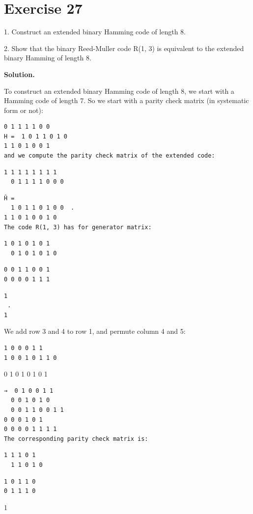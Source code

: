 \documentclass[11pt]{article}
\begin{document}
\section*{Exercise 27}
\begin{exercisebox}
1. Construct an extended binary Hamming code of length 8.

2. Show that the binary Reed-Muller code R(1, 3) is equivalent to the extended binary Hamming of length 8.

\end{exercisebox}
\begin{solutionbox}
\textbf{Solution.}

To construct an extended binary Hamming code of length 8, we start with a Hamming code of length 7. So we start with a parity check matrix (in systematic form or not):

\begin{Verbatim}[fontsize=\small]
0 1 1 1 1 0 0
H =  1 0 1 1 0 1 0
1 1 0 1 0 0 1
and we compute the parity check matrix of the extended code:
\end{Verbatim}
\begin{Verbatim}[fontsize=\small]
1 1 1 1 1 1 1 1
  0 1 1 1 1 0 0 0
\end{Verbatim}
\begin{Verbatim}[fontsize=\small]
Ĥ =
  1 0 1 1 0 1 0 0  .
1 1 0 1 0 0 1 0
The code R(1, 3) has for generator matrix:
\end{Verbatim}
\begin{Verbatim}[fontsize=\small]
1 0 1 0 1 0 1
  0 1 0 1 0 1 0
\end{Verbatim}
\begin{Verbatim}[fontsize=\small]
0 0 1 1 0 0 1
0 0 0 0 1 1 1
\end{Verbatim}
\begin{Verbatim}[fontsize=\small]
1
 .
1
\end{Verbatim}
We add row 3 and 4 to row 1, and permute column 4 and 5:

\begin{Verbatim}[fontsize=\small]
1 0 0 0 1 1
1 0 0 1 0 1 1 0
\end{Verbatim}
0 1 0 1 0 1 0 1

\begin{Verbatim}[fontsize=\small]
→  0 1 0 0 1 1
  0 0 1 0 1 0
  0 0 1 1 0 0 1 1
0 0 0 1 0 1
0 0 0 0 1 1 1 1
The corresponding parity check matrix is:
\end{Verbatim}
\begin{Verbatim}[fontsize=\small]
1 1 1 0 1
  1 1 0 1 0
\end{Verbatim}
\begin{Verbatim}[fontsize=\small]
1 0 1 1 0
0 1 1 1 0
\end{Verbatim}
1


\end{solutionbox}
\end{document}
